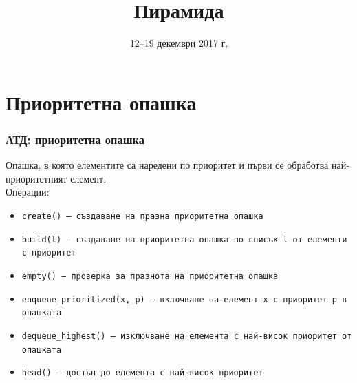 \documentclass{beamer}
\title{Пирамида}
\date{12--19 декември 2017 г.}
\begin{document}
\begin{frame}
  \titlepage
\end{frame}

\section{Приоритетна опашка}

\begin{frame}
  \frametitle{АТД: приоритетна опашка}

  Опашка, в която елементите са наредени по приоритет и първи се обработва най-приоритетният елемент.\\[1em]
  Операции:\\[0.5em]
  \begin{itemize}
  \item \tt{create()} --- създаване на празна приоритетна опашка
  \item \tt{build(l)} --- създаване на приоритетна опашка по списък \tt l от елементи с приоритет
  \item \tt{empty()} --- проверка за празнота на приоритетна опашка
  \item \tt{enqueue\_prioritized(x, p)} --- включване на елемент \tt x с приоритет \tt p в опашката
  \item \tt{dequeue\_highest()} --- изключване на елемента с най-висок приоритет от опашката
  \item \tt{head()} --- достъп до елемента с най-висок приоритет
  \end{itemize}
\end{frame}
\end{document}

